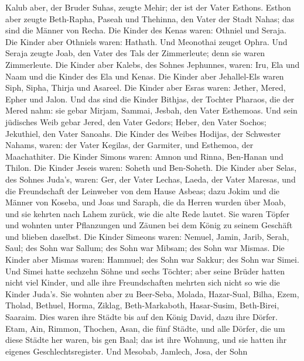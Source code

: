  Kalub aber, der Bruder Suhas, zeugte Mehir; der ist der
Vater Esthons.  Esthon aber zeugte Beth-Rapha, Paseah und
Thehinna, den Vater der Stadt Nahas; das sind die Männer von Recha.
 Die Kinder des Kenas waren: Othniel und Seraja. Die Kinder
aber Othniels waren: Hathath.  Und Meonothai zeuget Ophra.
Und Seraja zeugte Joab, den Vater des Tals der Zimmerleute; denn sie
waren Zimmerleute.  Die Kinder aber Kalebs, des Sohnes
Jephunnes, waren: Iru, Ela und Naam und die Kinder des Ela und Kenas.
 Die Kinder aber Jehallel-Els waren Siph, Sipha, Thirja und
Asareel.  Die Kinder aber Esras waren: Jether, Mered, Epher
und Jalon. Und das sind die Kinder Bithjas, der Tochter Pharaos, die der
Mered nahm: sie gebar Mirjam, Sammai, Jesbah, den Vater Esthemoas.
 Und sein jüdisches Weib gebar Jered, den Vater Gedors;
Heber, den Vater Sochos; Jekuthiel, den Vater Sanoahs.  Die
Kinder des Weibes Hodijas, der Schwester Nahams, waren: der Vater
Kegilas, der Garmiter, und Esthemoa, der Maachathiter.  Die
Kinder Simons waren: Amnon und Rinna, Ben-Hanan und Thilon. Die Kinder
Jeseis waren: Soheth und Ben-Soheth.  Die Kinder aber
Selas, des Sohnes Juda's, waren: Ger, der Vater Lechas, Laeda, der Vater
Maresas, und die Freundschaft der Leinweber von dem Hause Asbeas;
 dazu Jokim und die Männer von Koseba, und Joas und Saraph,
die da Herren wurden über Moab, und sie kehrten nach Lahem zurück, wie
die alte Rede lautet.  Sie waren Töpfer und wohnten unter
Pflanzungen und Zäunen bei dem König zu seinem Geschäft und blieben
daselbst.  Die Kinder Simeons waren: Nemuel, Jamin, Jarib,
Serah, Saul;  des Sohn war Sallum; des Sohn war Mibsam; des
Sohn war Mismas.  Die Kinder aber Mismas waren: Hammuel;
des Sohn war Sakkur; des Sohn war Simei.  Und Simei hatte
sechzehn Söhne und sechs Töchter; aber seine Brüder hatten nicht viel
Kinder, und alle ihre Freundschaften mehrten sich nicht so wie die
Kinder Juda's.  Sie wohnten aber zu Beer-Seba, Molada,
Hazar-Sual,  Bilha, Ezem, Tholad,  Bethuel,
Horma, Ziklag,  Beth-Markaboth, Hasar-Susim, Beth-Birei,
Saaraim. Dies waren ihre Städte bis auf den König David, dazu ihre
Dörfer.  Etam, Ain, Rimmon, Thochen, Asan, die fünf Städte,
 und alle Dörfer, die um diese Städte her waren, bis gen
Baal; das ist ihre Wohnung, und sie hatten ihr eigenes
Geschlechtsregister.  Und Mesobab, Jamlech, Josa, der Sohn
